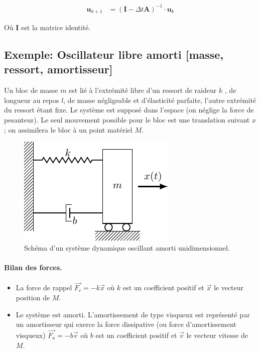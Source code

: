 \documentclass[%
oneside,                 %
final,                   %
10pt]{article}
\begin{document}
\begin{align}
\label{eq:euler_imp}
\pmb{u}_{k+1}  &=(\pmb{I} - \Delta t  \pmb{A})^{-1}  \cdot \pmb{u}_k
\end{align}


Où $\pmb{I}$ est la matrice identité.
\subsection{Exemple: Oscillateur libre amorti [masse, ressort, amortisseur]}
Un bloc de masse $m$ est lié à l'extrémité libre d'un ressort de raideur $k$ , de longueur au repos $l$, de masse négligeable et d'élasticité parfaite, l'autre extrémité du ressort étant fixe. Le système est supposé dans l'espace (on néglige la force de pesanteur). Le seul mouvement possible pour le bloc est une translation suivant $x$; on assimilera le bloc à un point matériel $M$.


\begin{figure}[!ht]  %
  \centerline{\includegraphics[width=0.7\linewidth]{imgs/oscillator.pdf}}
  \caption{
  Schéma d'un système dynamique oscillant amorti unidimensionnel.
  }
\end{figure}


\paragraph{Bilan des forces.}
\begin{itemize}
\item La force de rappel $\overrightarrow{F_r} = - k \overrightarrow{x}$ où $k$ est un coefficient positif et $\overrightarrow{x}$ le vecteur position de $M$.

\item Le système est amorti. L'amortissement de type visqueux est représenté par un amortisseur qui exerce la force dissipative (ou force d'amortissement visqueux) $\overrightarrow{F_a} = - b \overrightarrow{v}$ où $b$ est un coefficient positif et $\overrightarrow{v}$ le vecteur vitesse de $M$.
\end{itemize}
\end{document}

